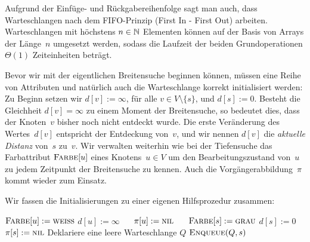 \begin{bem}
Aufgrund der Einfüge- und Rückgabereihenfolge sagt man auch, dass Warteschlangen nach dem FIFO-Prinzip (First In - First Out) arbeiten.
Warteschlangen mit höchstens $n \in \mathbb{N}$ Elementen können auf der Basis von Arrays der Länge~$n$ umgesetzt werden, sodass die Laufzeit der beiden Grundoperationen $\Theta(1)$ Zeiteinheiten beträgt. 
\end{bem} 

\begin{bem} 
Bevor wir mit der eigentlichen Breitensuche beginnen können, müssen eine Reihe von Attributen und natürlich auch die Warteschlange korrekt initialisiert werden:
Zu Beginn setzen wir $d[v]:=\infty$, für alle $v \in V \setminus \{s\}$, und $d[s]:=0$.
Besteht die Gleichheit $d[v]=\infty$ zu einem Moment der Breitensuche, so bedeutet dies, dass der Knoten~$v$ bisher noch nicht entdeckt wurde.
Die erste Veränderung des Wertes~$d[v]$ entspricht der Entdeckung von~$v$, und wir nennen $d[v]$ die \emph{aktuelle Distanz} von~$s$ zu~$v$. 
Wir verwalten weiterhin wie bei der Tiefensuche das Farbattribut $\mathop{\text{\textsc{Farbe}}}[u]$ eines Knotens~$u \in V$ um den Bearbeitungszustand von~$u$ zu jedem Zeitpunkt der Breitensuche zu kennen.
Auch die Vorgängerabbildung~$\pi$ kommt wieder zum Einsatz.
\end{bem} 


\begin{bem} 
Wir fassen die Initialisierungen zu einer eigenen Hilfsprozedur zusammen:

\begin{algorithm}[H]
\caption{$\cc{Breitensuche-initialisieren}(D,s)$}
\begin{algorithmic}[1]
  \STATE $\mathop{\text{\textsc{Farbe}}}[u] := \mathop{\text{\textsc{weiss}}}$
  \STATE $d[u] := \infty$ $\quad$ 
  \STATE $\pi[u] := \mathop{\text{\textsc{nil}}}$ $\quad$ 
 \ENDFOR
 \STATE $\mathop{\text{\textsc{Farbe}}}[s] := \mathop{\text{\textsc{grau}}}$
 \STATE $d[s] := 0$
 \STATE $\pi[s] := \mathop{\text{\textsc{nil}}}$
 \STATE Deklariere eine leere Warteschlange $Q$
 \STATE $\mathop{\text{\textsc{Enqueue}}}(Q,s)$
\end{algorithmic}
\end{algorithm}
\end{bem}

